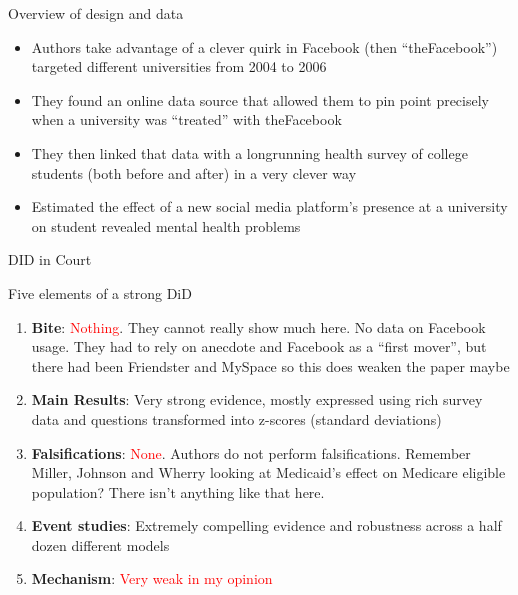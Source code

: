 \documentclass{beamer}
\begin{document}
\begin{frame}{Overview of design and data}

\begin{itemize}
\item Authors take advantage of a clever quirk in Facebook (then ``theFacebook'') targeted different universities from 2004 to 2006
\item They found an online data source that allowed them to pin point precisely when a university was ``treated'' with theFacebook
\item They then linked that data with a longrunning health survey of college students (both before and after) in a very clever way
\item Estimated the effect of a new social media platform's presence at a university on student revealed mental health problems

\end{itemize}

\end{frame}


\begin{frame}{DID in Court}

Five elements of a strong DiD
\begin{enumerate}

\item \textbf{Bite}: \textcolor{red}{Nothing}. They cannot really show much here.  No data on Facebook usage.  They had to rely on anecdote and Facebook as a ``first mover'', but there had been Friendster and MySpace so this does weaken the paper maybe
\item \textbf{Main Results}: Very strong evidence, mostly expressed using rich survey data and questions transformed into z-scores (standard deviations)
\item \textbf{Falsifications}: \textcolor{red}{None}. Authors do not perform falsifications. Remember Miller, Johnson and Wherry looking at Medicaid's effect on Medicare eligible population?  There isn't anything like that here.
\item \textbf{Event studies}: Extremely compelling evidence and robustness across a half dozen different models
\item \textbf{Mechanism}: \textcolor{red}{Very weak in my opinion}

\end{enumerate}

\end{frame}
\end{document}
